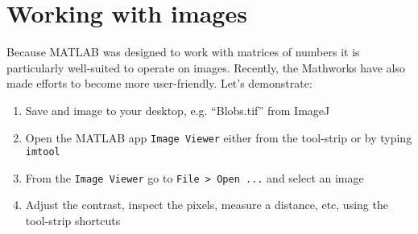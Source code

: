 \section{Working with images}
Because MATLAB was designed to work with matrices of numbers it is particularly well-suited to operate on images.
Recently, the Mathworks have also made efforts to become more user-friendly. Let's demonstrate:

\begin{enumerate}
\item Save and image to your desktop, e.g. ``Blobs.tif'' from ImageJ
\item Open the MATLAB app \lstinline{Image Viewer} either from the tool-strip or by typing \lstinline{imtool}
\item From the \lstinline{Image Viewer} go to \lstinline{File > Open ...} and select an image
\item Adjust the contrast, inspect the pixels, measure a distance, etc, using the tool-strip shortcuts
\end{enumerate}